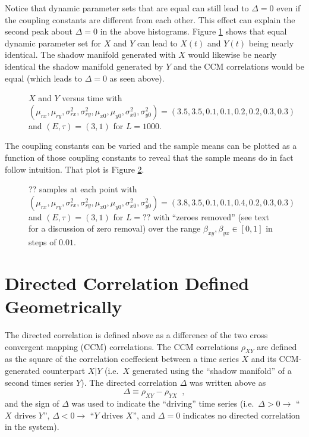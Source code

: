\documentclass[a4paper,11pt]{article}
\begin{document}
Notice that dynamic parameter sets that are equal can still lead to $\Delta=0$ even if the coupling constants are different from each other.  This effect can explain the second peak about $\Delta=0$ in the above histograms.  Figure \ref{fig:TwoPopDynSameParms} shows that equal dynamic parameter set for $X$ and $Y$ can lead to $X(t)$ and $Y(t)$ being nearly identical.  The shadow manifold generated with $X$ would likewise be nearly identical the shadow manifold generated by $Y$ and the CCM correlations would be equal (which leads to $\Delta=0$ as seen above).  
\begin{figure}[h!t]
\centering
\label{fig:TwoPopDynSameParms}
\caption{$X$ and $Y$ versus time with $\left(\mu_{rx},\mu_{ry},\sigma^2_{rx},\sigma^2_{ry},\mu_{x0},\mu_{y0},\sigma^2_{x0},\sigma^2_{y0}\right) = \left(3.5,3.5,0.1,0.1,0.2,0.2,0.3,0.3\right)$ and $\left(E,\tau\right)=\left(3,1\right)$ for $L=1000$.}
\end{figure}

The coupling constants can be varied and the sample means can be plotted as a function of those coupling constants to reveal that the sample means do in fact follow intuition.  That plot is Figure \ref{fig:TwoPopSamplByxBxy}.
\begin{figure}[h!t]
\centering
\label{fig:TwoPopSamplByxBxy}
\caption{?? samples at each point with $\left(\mu_{rx},\mu_{ry},\sigma^2_{rx},\sigma^2_{ry},\mu_{x0},\mu_{y0},\sigma^2_{x0},\sigma^2_{y0}\right) = \left(3.8,3.5,0.1,0.1,0.4,0.2,0.3,0.3\right)$ and $\left(E,\tau\right)=\left(3,1\right)$ for $L=??$ with ``zeroes removed'' (see text for a discussion of zero removal) over the range $\beta_{xy},\beta_{yx}\in[0,1]$ in steps of $0.01$.}
\end{figure}

\section{Directed Correlation Defined Geometrically}

The directed correlation is defined above as a difference of the two cross convergent mapping (CCM) correlations.  The CCM correlations $\rho_{XY}$ are defined as the square of the correlation coeffecient between a time series $X$ and its CCM-generated counterpart $X|Y$ (i.e.\ $X$ generated using the ``shadow manifold'' of a second times series $Y$).  The directed correlation $\Delta$ was written above as
$$
\Delta \equiv \rho_{XY} - \rho_{YX}\;\;,
$$
and the sign of $\Delta$ was used to indicate the ``driving'' time series (i.e.\ $\Delta>0\rightarrow$ ``$X$ drives $Y$'', $\Delta<0\rightarrow$ ``$Y$ drives $X$'', and $\Delta=0$ indicates no directed correlation in the system).
\end{document}
